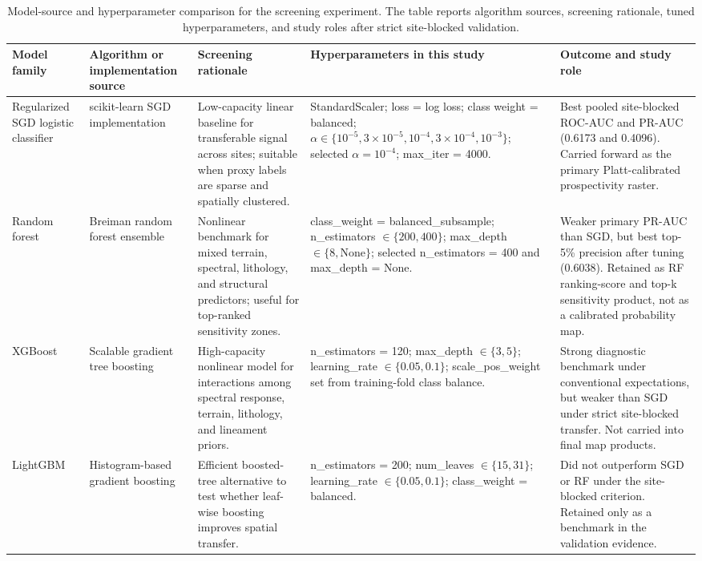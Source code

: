 \documentclass[numrefs]{interact}
\let\cite\citep
\theoremstyle{plain}%
\theoremstyle{definition}
\theoremstyle{remark}
\begin{document}
\begin{table}
\centering
\small
\caption{Model-source and hyperparameter comparison for the screening experiment. The table reports algorithm sources, screening rationale, tuned hyperparameters, and study roles after strict site-blocked validation.}
\label{tab:model-source-hyperparameters}
\begin{tabular}{p{}p{}p{}p{}p{}}
\toprule
Model family & Algorithm or implementation source & Screening rationale & Hyperparameters in this study & Outcome and study role \\
\midrule
Regularized SGD logistic classifier & scikit-learn SGD implementation \cite{pedregosa2011scikit} & Low-capacity linear baseline for transferable signal across sites; suitable when proxy labels are sparse and spatially clustered. & StandardScaler; loss = log loss; class weight = balanced; \(\alpha\in\{10^{-5},3\times10^{-5},10^{-4},3\times10^{-4},10^{-3}\}\); selected \(\alpha=10^{-4}\); max\_iter = 4000. & Best pooled site-blocked ROC-AUC and PR-AUC (0.6173 and 0.4096). Carried forward as the primary Platt-calibrated prospectivity raster. \\
Random forest & Breiman random forest ensemble \cite{breiman2001randomforests} & Nonlinear benchmark for mixed terrain, spectral, lithology, and structural predictors; useful for top-ranked sensitivity zones. & class\_weight = balanced\_subsample; n\_estimators \(\in\{200,400\}\); max\_depth \(\in\{8,\mathrm{None}\}\); selected n\_estimators = 400 and max\_depth = None. & Weaker primary PR-AUC than SGD, but best top-5\% precision after tuning (0.6038). Retained as RF ranking-score and top-k sensitivity product, not as a calibrated probability map. \\
XGBoost & Scalable gradient tree boosting \cite{chen2016xgboost} & High-capacity nonlinear model for interactions among spectral response, terrain, lithology, and lineament priors. & n\_estimators = 120; max\_depth \(\in\{3,5\}\); learning\_rate \(\in\{0.05,0.1\}\); scale\_pos\_weight set from training-fold class balance. & Strong diagnostic benchmark under conventional expectations, but weaker than SGD under strict site-blocked transfer. Not carried into final map products. \\
LightGBM & Histogram-based gradient boosting \cite{ke2017lightgbm} & Efficient boosted-tree alternative to test whether leaf-wise boosting improves spatial transfer. & n\_estimators = 200; num\_leaves \(\in\{15,31\}\); learning\_rate \(\in\{0.05,0.1\}\); class\_weight = balanced. & Did not outperform SGD or RF under the site-blocked criterion. Retained only as a benchmark in the validation evidence. \\
\bottomrule
\end{tabular}
\end{table}
\end{document}
